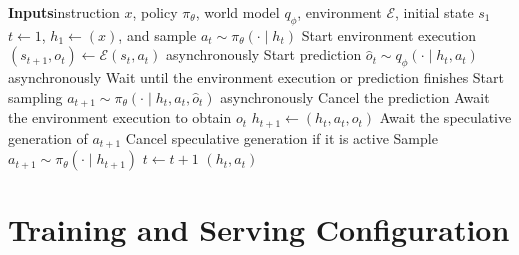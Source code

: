 \documentclass{article} %
\newcommand{\method}{\textsc{ObsSpec}}
\begin{document}
\begin{algorithm}[H]
\caption{\method\ rollout collection for $D=K=1$.}
\label{alg:wmspec}
\begin{algorithmic}[1]
\Statex \textbf{Inputs}\quad instruction $x$, policy $\pi_\theta$, world model $q_\phi$, environment $\mathcal{E}$, initial state $s_1$
\State $t \gets 1$, $h_1 \gets (x)$, and sample $a_t \sim \pi_\theta(\cdot\mid h_t)$
    \State Start environment execution $(s_{t+1},o_t) \gets \mathcal{E}(s_t,a_t)$ asynchronously
    \State Start prediction $\widehat{o}_t \sim q_\phi(\cdot\mid h_t,a_t)$ asynchronously
    \State Wait until the environment execution or prediction finishes
        \State Start sampling $a_{t+1} \sim \pi_\theta(\cdot\mid h_t,a_t,\widehat{o}_t)$ asynchronously
    \Else
        \State Cancel the prediction
    \EndIf
    \State Await the environment execution to obtain $o_t$
    \State $h_{t+1} \gets (h_t,a_t,o_t)$
        \State Await the speculative generation of $a_{t+1}$
    \Else
        \State Cancel speculative generation if it is active
        \State Sample $a_{t+1} \sim \pi_\theta(\cdot\mid h_{t+1})$
    \EndIf
    \State $t \gets t+1$
\EndWhile
\State \Return $(h_t,a_t)$
\end{algorithmic}
\end{algorithm}

\section{Training and Serving Configuration}
\label{sec:training-configuration}
\end{document}
